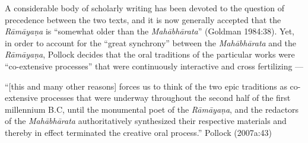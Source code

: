 A considerable body of scholarly writing has been devoted to the question of precedence between the two texts, and it is now generally accepted that the {\sl Rāmāyaṇa} is “somewhat older than the {\sl Mahābhārata}” (Goldman 1984:38). Yet, in order to account for the “great synchrony” between the {\sl Mahābhārata} and the {\sl Rāmāyaṇa}, Pollock decides that the oral traditions of the particular works were “co-extensive processes” that were continuously interactive and cross fertilizing ---

\begin{myquote}
“[this and many other reasons] forces us to think of the two epic traditions as co-extensive processes that were underway throughout the second half of the first millennium B.C, until the monumental poet of the {\sl Rāmāyaṇa}, and the redactors of the {\sl Mahābhārata} authoritatively synthesized their respective materials and thereby in effect terminated the creative oral process.”
\hfill Pollock (2007a:43)
\end{myquote}

